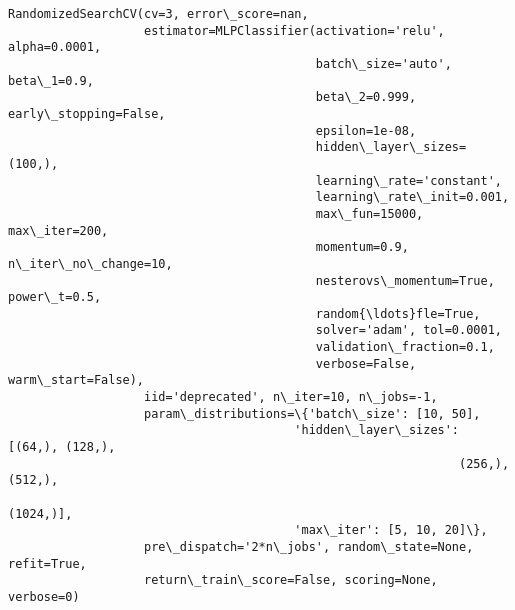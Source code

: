 \documentclass[11pt]{article}
\makeatletter
\newcommand{\boxspacing}{\kern\kvtcb@left@rule\kern\kvtcb@boxsep}
\newcommand{\prompt}[4]{
        \ttfamily\llap{{\color{#2}[#3]:\hspace{3pt}#4}}\vspace{-\baselineskip}
    }
\makeatother
\begin{document}
            \begin{tcolorbox}[breakable, size=fbox, boxrule=.5pt, pad at break*=1mm, opacityfill=0]
\prompt{Out}{outcolor}{ }{\boxspacing}
\begin{Verbatim}[commandchars=\\\{\}]
RandomizedSearchCV(cv=3, error\_score=nan,
                   estimator=MLPClassifier(activation='relu', alpha=0.0001,
                                           batch\_size='auto', beta\_1=0.9,
                                           beta\_2=0.999, early\_stopping=False,
                                           epsilon=1e-08,
                                           hidden\_layer\_sizes=(100,),
                                           learning\_rate='constant',
                                           learning\_rate\_init=0.001,
                                           max\_fun=15000, max\_iter=200,
                                           momentum=0.9, n\_iter\_no\_change=10,
                                           nesterovs\_momentum=True, power\_t=0.5,
                                           random{\ldots}fle=True,
                                           solver='adam', tol=0.0001,
                                           validation\_fraction=0.1,
                                           verbose=False, warm\_start=False),
                   iid='deprecated', n\_iter=10, n\_jobs=-1,
                   param\_distributions=\{'batch\_size': [10, 50],
                                        'hidden\_layer\_sizes': [(64,), (128,),
                                                               (256,), (512,),
                                                               (1024,)],
                                        'max\_iter': [5, 10, 20]\},
                   pre\_dispatch='2*n\_jobs', random\_state=None, refit=True,
                   return\_train\_score=False, scoring=None, verbose=0)
\end{Verbatim}
\end{tcolorbox}
        
\end{document}
